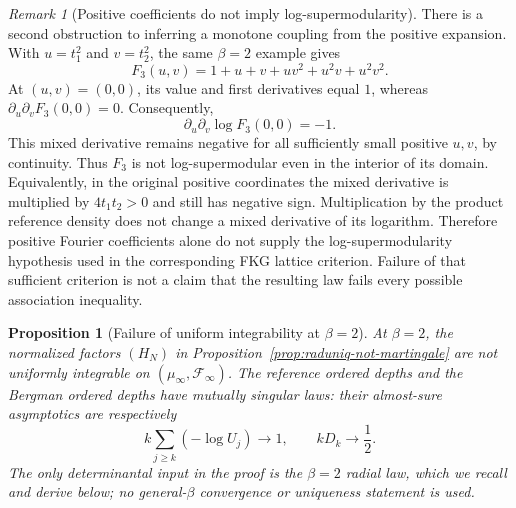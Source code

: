 \documentclass[11pt,a4paper]{article}
\numberwithin{equation}{section}
\newtheorem{proposition}[theorem]{Proposition}
\theoremstyle{definition}
\theoremstyle{remark}
\newtheorem{remark}[theorem]{Remark}
\begin{document}
\begin{remark}[Positive coefficients do not imply log-supermodularity]
There is a second obstruction to inferring a monotone coupling from the
positive expansion. With $u=t_1^2$ and $v=t_2^2$, the same $\beta=2$
example gives
\[
 F_3(u,v)=1+u+v+uv^2+u^2v+u^2v^2.
\]
At $(u,v)=(0,0)$, its value and first derivatives equal $1$, whereas
$\partial_u\partial_v F_3(0,0)=0$. Consequently,
\[
 \partial_u\partial_v\log F_3(0,0)=-1.
\]
This mixed derivative remains negative for all sufficiently small
positive $u,v$, by continuity. Thus $F_3$ is not log-supermodular even
in the interior of its domain. Equivalently, in the original positive
coordinates the mixed derivative is multiplied by $4t_1t_2>0$ and
still has negative sign. Multiplication by the product reference density
does not change a mixed derivative of its logarithm. Therefore positive
Fourier coefficients alone do not supply the log-supermodularity
hypothesis used in the corresponding FKG lattice criterion. Failure of
that sufficient criterion is not a claim that the resulting law fails
every possible association inequality.
\end{remark}

\begin{proposition}[Failure of uniform integrability at $\beta=2$]
\label{prop:raduniq-no-ui}
At $\beta=2$, the normalized factors $(H_N)$ in
Proposition~\ref{prop:raduniq-not-martingale} are not uniformly
integrable on $(\mu_\infty,\mathcal F_\infty)$.
The reference ordered depths and the Bergman ordered depths have
mutually singular laws: their almost-sure asymptotics are respectively
\begin{equation}\label{eq:raduniq-incompatible-depths}
 k\sum_{j\ge k}(-\log U_j)\longrightarrow1,
 \qquad kD_k\longrightarrow\frac12.
\end{equation}
The only determinantal input in the proof is the $\beta=2$ radial law,
which we recall and derive below; no general-$\beta$ convergence or
uniqueness statement is used.
\end{proposition}
\end{document}
